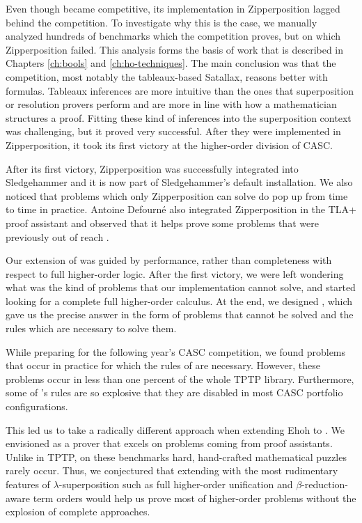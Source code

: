 Even though \lsup{} became competitive, its implementation in Zipperposition
lagged behind the competition. To investigate why this is the case,
we manually analyzed hundreds of benchmarks which the competition proves, but
on which Zipperposition failed. This analysis forms the basis of work that is
described in Chapters \ref{ch:bools} and \ref{ch:ho-techniques}. The main
conclusion was that the competition, most notably the tableaux-based Satallax,
reasons better with formulas. Tableaux inferences are more intuitive than the
ones that superposition or resolution provers perform and are more in line with
how a mathematician structures a proof. Fitting these kind of
inferences into the superposition context was challenging, but it proved very
successful. After they were implemented in Zipperposition, it took its first
victory at the higher-order division of CASC.

After its first victory, Zipperposition was successfully integrated into
Sledgehammer and it is now part of Sledgehammer's default installation. We also noticed
that problems which only Zipperposition can solve do pop up from time to time in
practice. Antoine Defourné also integrated Zipperposition in the TLA+ proof
assistant and observed that it helps prove some problems that were previously
out of reach \cite{ad-21-ho-tlaplus}.

Our extension of \lsup{} was guided by performance, rather than completeness
with respect to full higher-order logic. After the first victory, we were left
wondering what was the kind of problems that our implementation cannot
solve, and started looking for a complete full higher-order calculus. At the end,
we designed \osup{}, which gave us the precise answer in the form of problems that
cannot be solved and the rules which are necessary to solve them. 

While preparing for the following year's CASC competition, we found problems
that occur in practice for which the rules of \osup{} are necessary. However,
these problems occur in less than one percent of the whole TPTP library.
Furthermore, some of \osup{}'s rules are so explosive that they are disabled in
most CASC portfolio configurations.

This led us to take a radically different approach when extending Ehoh to
\ehohii{}. We envisioned \ehohii{} as a prover that excels on problems coming
from proof assistants. Unlike in TPTP, on these benchmarks hard, hand-crafted mathematical puzzles rarely occur.
Thus, we conjectured that extending \lfsup{} with the most rudimentary features
of $\lambda$-superposition such as full higher-order unification and
$\beta$-reduction-aware term orders would help us prove most of higher-order
problems without the explosion of complete approaches.

